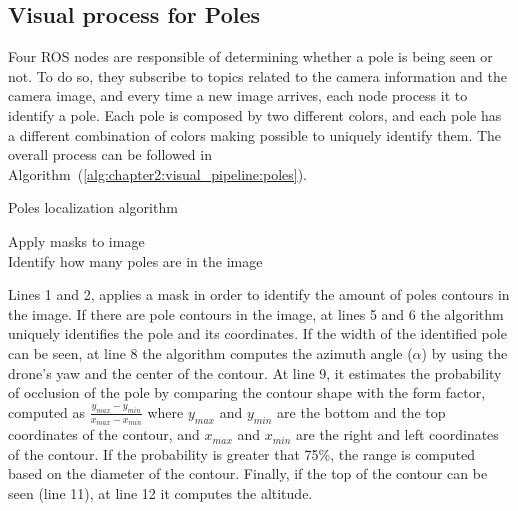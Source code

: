 \subsection{Visual process for Poles}
Four \ac{ROS} nodes are responsible of determining whether a pole is being seen or not. To do so, they subscribe to topics related to the camera information and the camera image, and every time a new image arrives, each node process it to identify a pole. Each pole is composed by two different colors, and each pole has a different combination of colors making possible to uniquely identify them. The overall process can be followed in Algorithm~(\ref{alg:chapter2:visual_pipeline:poles}).\\
\begin{algorithm}[h]
    \caption{Poles localization algorithm}
    \label{alg:chapter2:visual_pipeline:poles}
    \BlankLine
    \BlankLine
    Apply masks to image\\
    Identify how many poles are in the image\\
    \BlankLine
    \Return{$\alpha$, $\beta$, $\rho$}
\end{algorithm}

Lines 1 and 2, applies a mask in order to identify the amount of poles contours in the image. If there are pole contours in the image, at lines 5 and 6 the algorithm uniquely identifies the pole and its coordinates. If the width of the identified pole can be seen, at line 8 the algorithm computes the azimuth angle ($\alpha$) by using the drone's yaw and the center of the contour. At line 9, it estimates the probability of occlusion of the pole by comparing the contour shape with the form factor, computed as $\frac{y_{max} - y_{min}}{x_{max} - x_{min}}$ where $y_{max}$ and $y_{min}$ are the bottom and the top coordinates of the contour, and $x_{max}$ and $x_{min}$ are the right and left coordinates of the contour. If the probability is greater that 75\%, the range is computed based on the diameter of the contour. Finally, if the top of the contour can be seen (line 11), at line 12 it computes the altitude.

